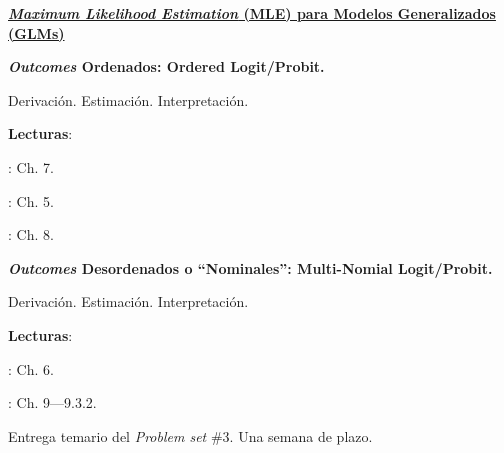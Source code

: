 \documentclass[letterpaper]{article}
\renewenvironment{itemize}{
  \begin{list}{}{
    \setlength{\leftmargin}{1.5em}
  }
}{
  \end{list}
}
\begin{document}
\begin{enumerate}[label=\roman*.]
\item {\bf{\color{ForestGreen}\underline{\emph{Maximum Likelihood Estimation} (MLE) para Modelos Generalizados (GLMs)}}}

       \begin{itemize} 
        \item[15.] {\bf \emph{Outcomes} Ordenados: Ordered Logit/Probit.}
        \begin{itemize} 
          \item[$\circ$] Derivaci\'on. Estimaci\'on. Interpretaci\'on.
          \item[$\circ$] {\bf Lecturas}: 
            \begin{itemize} 
              \item[$\diamond$] \textcite{Ward2018}: Ch. 7. 
              \item[$\diamond$] \textcite{Long2001}: Ch. 5.
              \item[$\diamond$] \textcite{Ward2018}: Ch. 8. 
            \end{itemize}
        \end{itemize}
      \end{itemize}



       \begin{itemize} 
        \item[16.] {\bf \emph{Outcomes} Desordenados o ``Nominales'': Multi-Nomial Logit/Probit.}
        \begin{itemize} 
          \item[$\circ$] Derivaci\'on. Estimaci\'on. Interpretaci\'on.
          \item[$\circ$] {\bf Lecturas}: 
            \begin{itemize} 
              \item[$\diamond$] \textcite{Long2001}: Ch. 6.
              \item[$\diamond$] \textcite{Ward2018}: Ch. 9---9.3.2.
            \end{itemize}
        \end{itemize}
      \end{itemize}



\item[{\color{red}\Pointinghand}] Entrega temario del \emph{Problem set} \#3. Una semana de plazo.




\end{enumerate}
\end{document}
